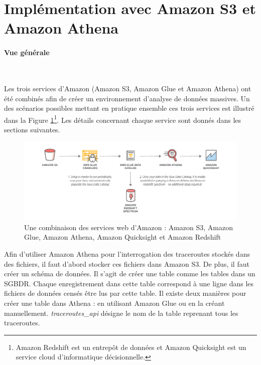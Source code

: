\section{Implémentation avec Amazon S3 et Amazon Athena} \label{implementation-athena}


\paragraph{Vue générale}~

Les trois services d'Amazon (Amazon S3, Amazon Glue  et Amazon Athena) ont été combinés  afin de créer un environnement d'analyse de données massives. 
Un des scénarios possibles mettant en pratique ensemble ces trois services est illustré dans la Figure
\ref{fig:gluecrawler}\footnote{Amazon Redshift  est un entrepôt de données et  Amazon Quicksight  est un service cloud d'informatique décisionnelle.}. Les  détails concernant chaque service sont donnés dans les sections suivantes.

\begin{figure}[h]
	\centering
	\captionsetup{justification=centering}
	\includegraphics[width=1\linewidth]{illustrations/glue_crawler}
	\caption{Une combinaison des services web d'Amazon : Amazon S3, Amazon Glue, Amazon Athena, Amazon Quicksight  et Amazon Redshift}
	\label{fig:gluecrawler}
\end{figure}
Afin d'utiliser Amazon Athena pour l'interrogation des traceroutes stockés dans des fichiers, il faut d'abord  stocker ces fichiers dans Amazon S3. De plus, il faut créer un  schéma de données. Il s'agit de créer une table comme les tables dans un SGBDR. Chaque enregistrement dans cette table correspond à une ligne dans les fichiers de données censés être lus par cette table. Il existe deux manières pour créer une table dans Athena : en utilisant Amazon Glue ou en la créant  manuellement.  \textit{traceroutes\_api} désigne le nom de la table reprenant tous les traceroutes.




